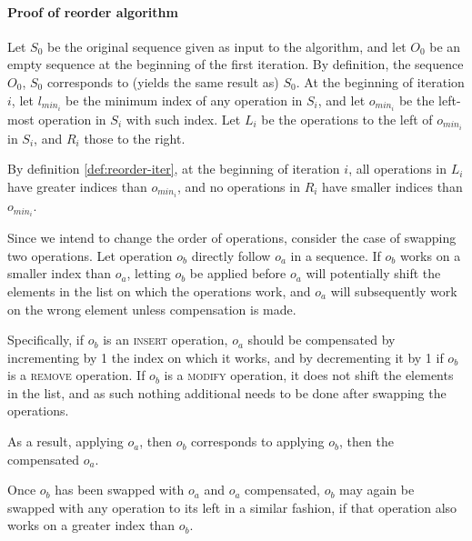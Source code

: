 \paragraph {Proof of reorder algorithm}
\begin{definition}
\label{def:reorder-iter}

Let $S_0$ be the original sequence given as input to the algorithm, and let
$O_0$ be an empty sequence at the beginning of the first iteration. By
definition, the sequence $O_0$, $S_0$ corresponds to (yields the same result as)
$S_0$. At the beginning of iteration $i$, let $l_{min_i}$ be the minimum index
of any operation in $S_i$, and let $o_{min_i}$ be the left-most operation in
$S_i$ with such index. Let $L_i$ be the operations to the left of $o_{min_i}$ in
$S_i$, and $R_i$ those to the right.

\end{definition}

\begin{lemma}
\label{lem:reorder-inequality}

By definition \ref{def:reorder-iter}, at the beginning of iteration $i$, all
operations in $L_i$ have greater indices than $o_{min_i}$, and no operations in
$R_i$ have smaller indices than $o_{min_i}$.

\end{lemma}

Since we intend to change the order of operations, consider the case of swapping
two operations. Let operation $o_b$ directly follow $o_a$ in a sequence. If
$o_b$ works on a smaller index than $o_a$, letting $o_b$ be applied before $o_a$
will potentially shift the elements in the list on which the operations work,
and $o_a$ will subsequently work on the wrong element unless compensation is
made.

Specifically, if $o_b$ is an \textsc{insert} operation, $o_a$ should be
compensated by incrementing by 1 the index on which it works, and by
decrementing it by 1 if $o_b$ is a \textsc{remove} operation. If $o_b$ is a
\textsc{modify} operation, it does not shift the elements in the list, and as
such nothing additional needs to be done after swapping the operations.

As a result, applying $o_a$, then $o_b$ corresponds to applying $o_b$, then the
compensated $o_a$.

Once $o_b$ has been swapped with $o_a$ and $o_a$ compensated, $o_b$ may again be
swapped with any operation to its left in a similar fashion, if that operation
also works on a greater index than $o_b$.

